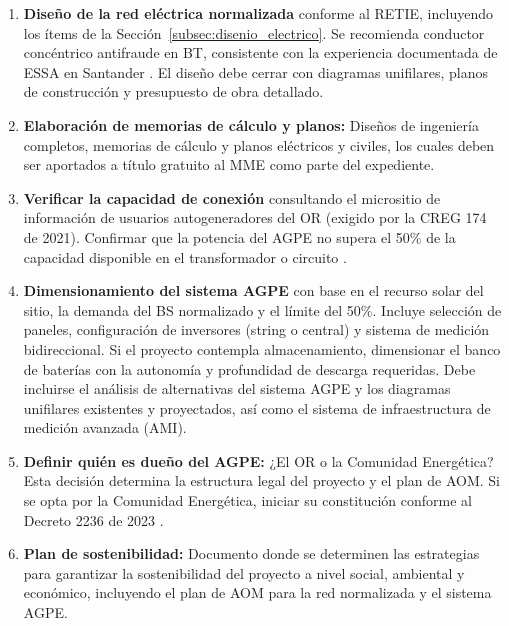 \begin{enumerate}[label=\textbf{\arabic*.}, leftmargin=1.8cm, itemsep=6pt]

    \item \textbf{Diseño de la red eléctrica normalizada} conforme al
    RETIE, incluyendo los ítems de la Sección~\ref{subsec:disenio_electrico}.
    Se recomienda conductor concéntrico antifraude en BT, consistente
    con la experiencia documentada de ESSA en Santander
    \parencite{MendezFuentes2013}. El diseño debe cerrar con diagramas
    unifilares, planos de construcción y presupuesto de obra detallado.

    \item \textbf{Elaboración de memorias de cálculo y planos:} Diseños
    de ingeniería completos, memorias de cálculo y planos eléctricos y
    civiles, los cuales deben ser aportados a título gratuito al MME
    como parte del expediente.

    \item \textbf{Verificar la capacidad de conexión} consultando el
    micrositio de información de usuarios autogeneradores del OR (exigido
    por la CREG 174 de 2021). Confirmar que la potencia del AGPE no
    supera el 50\% de la capacidad disponible en el transformador o
    circuito \parencite{ResolucionCREG174_2021}.

    \item \textbf{Dimensionamiento del sistema AGPE} con base en el
    recurso solar del sitio, la demanda del BS normalizado y el límite
    del 50\%. Incluye selección de paneles, configuración de inversores
    (string o central) y sistema de medición bidireccional. Si el
    proyecto contempla almacenamiento, dimensionar el banco de baterías
    con la autonomía y profundidad de descarga requeridas. Debe incluirse
    el análisis de alternativas del sistema AGPE y los diagramas
    unifilares existentes y proyectados, así como el sistema de
    infraestructura de medición avanzada (AMI).

    \item \textbf{Definir quién es dueño del AGPE:} ¿El OR o la
    Comunidad Energética? Esta decisión determina la estructura legal
    del proyecto y el plan de AOM. Si se opta por la Comunidad
    Energética, iniciar su constitución conforme al Decreto 2236 de
    2023 \parencite{Decreto2236_2023}.

    \item \textbf{Plan de sostenibilidad:} Documento donde se determinen
    las estrategias para garantizar la sostenibilidad del proyecto a
    nivel social, ambiental y económico, incluyendo el plan de AOM para
    la red normalizada y el sistema AGPE.


\end{enumerate}

